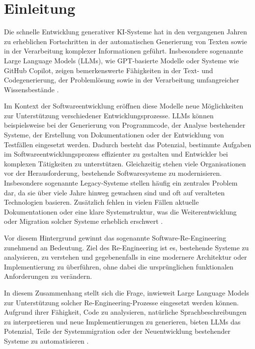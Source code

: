 
\chapter{Einleitung}

Die schnelle Entwicklung generativer KI-Systeme hat in den vergangenen Jahren zu erheblichen Fortschritten in der automatischen Generierung von Texten sowie in der Verarbeitung komplexer Informationen geführt. Insbesondere sogenannte Large Language Models (LLMs), wie GPT-basierte Modelle oder Systeme wie GitHub Copilot, zeigen bemerkenswerte Fähigkeiten in der Text- und Codegenerierung, der Problemlösung sowie in der Verarbeitung umfangreicher Wissensbestände \cite{brown2020languagemodelsfewshotlearners}.

Im Kontext der Softwareentwicklung eröffnen diese Modelle neue Möglichkeiten zur Unterstützung verschiedener Entwicklungsprozesse. LLMs können beispielsweise bei der Generierung von Programmcode, der Analyse bestehender Systeme, der Erstellung von Dokumentationen oder der Entwicklung von Testfällen eingesetzt werden. Dadurch besteht das Potenzial, bestimmte Aufgaben im Softwareentwicklungsprozess effizienter zu gestalten und Entwickler bei komplexen Tätigkeiten zu unterstützen.
Gleichzeitig stehen viele Organisationen vor der Herausforderung, bestehende Softwaresysteme zu modernisieren. Insbesondere sogenannte Legacy-Systeme stellen häufig ein zentrales Problem dar, da sie über viele Jahre hinweg gewachsen sind und oft auf veralteten Technologien basieren. Zusätzlich fehlen in vielen Fällen aktuelle Dokumentationen oder eine klare Systemstruktur, was die Weiterentwicklung oder Migration solcher Systeme erheblich erschwert \cite{chen2021evaluatinglargelanguagemodels}.

Vor diesem Hintergrund gewinnt das sogenannte Software-Re-Engineering zunehmend an Bedeutung. Ziel des Re-Engineering ist es, bestehende Systeme zu analysieren, zu verstehen und gegebenenfalls in eine modernere Architektur oder Implementierung zu überführen, ohne dabei die ursprünglichen funktionalen Anforderungen zu verändern.

In diesem Zusammenhang stellt sich die Frage, inwieweit Large Language Models zur Unterstützung solcher Re-Engineering-Prozesse eingesetzt werden können. Aufgrund ihrer Fähigkeit, Code zu analysieren, natürliche Sprachbeschreibungen zu interpretieren und neue Implementierungen zu generieren, bieten LLMs das Potenzial, Teile der Systemmigration oder der Neuentwicklung bestehender Systeme zu automatisieren \cite{inproceedings}.

